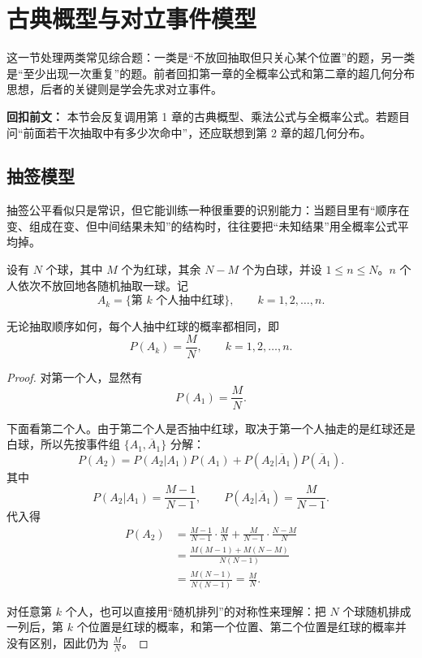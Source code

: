 ﻿\documentclass[lang=cn,11pt]{elegantbook}
\begin{document}
\section{古典概型与对立事件模型}

这一节处理两类常见综合题：一类是“不放回抽取但只关心某个位置”的题，另一类是“至少出现一次重复”的题。前者回扣第一章的全概率公式和第二章的超几何分布思想，后者的关键则是学会先求对立事件。

\begin{note}
\textbf{回扣前文：} 本节会反复调用第 1 章的古典概型、乘法公式与全概率公式。若题目问“前面若干次抽取中有多少次命中”，还应联想到第 2 章的超几何分布。
\end{note}

\subsection{抽签模型}

抽签公平看似只是常识，但它能训练一种很重要的识别能力：当题目里有“顺序在变、组成在变、但中间结果未知”的结构时，往往要把“未知结果”用全概率公式平均掉。

\begin{definition}[抽签模型]\label{def:drawing-lots-model}
设有 \(N\) 个球，其中 \(M\) 个为红球，其余 \(N-M\) 个为白球，并设 \(1\le n\le N\)。\(n\) 个人依次不放回地各随机抽取一球。记
\[
A_k=\{\text{第 }k\text{ 个人抽中红球}\},\qquad k=1,2,\dots,n.
\]
\end{definition}

\begin{theorem}[抽签的公平性]\label{thm:drawing-lots-fairness}
无论抽取顺序如何，每个人抽中红球的概率都相同，即
\[
P(A_k)=\frac{M}{N},\qquad k=1,2,\dots,n.
\]
\end{theorem}

\begin{proof}
对第一个人，显然有
\[
P(A_1)=\frac{M}{N}.
\]

下面看第二个人。由于第二个人是否抽中红球，取决于第一个人抽走的是红球还是白球，所以先按事件组 \(\{A_1,\overline{A}_1\}\) 分解：
\[
P(A_2)=P(A_2|A_1)P(A_1)+P(A_2|\overline{A}_1)P(\overline{A}_1).
\]
其中
\[
P(A_2|A_1)=\frac{M-1}{N-1},\qquad P(A_2|\overline{A}_1)=\frac{M}{N-1}.
\]
代入得
\begin{align*}
P(A_2)
&=\frac{M-1}{N-1}\cdot\frac{M}{N}+\frac{M}{N-1}\cdot\frac{N-M}{N} \\
&=\frac{M(M-1)+M(N-M)}{N(N-1)} \\
&=\frac{M(N-1)}{N(N-1)}=\frac{M}{N}.
\end{align*}

对任意第 \(k\) 个人，也可以直接用“随机排列”的对称性来理解：把 \(N\) 个球随机排成一列后，第 \(k\) 个位置是红球的概率，和第一个位置、第二个位置是红球的概率并没有区别，因此仍为 \(\frac{M}{N}\)。
\end{proof}
\end{document}
